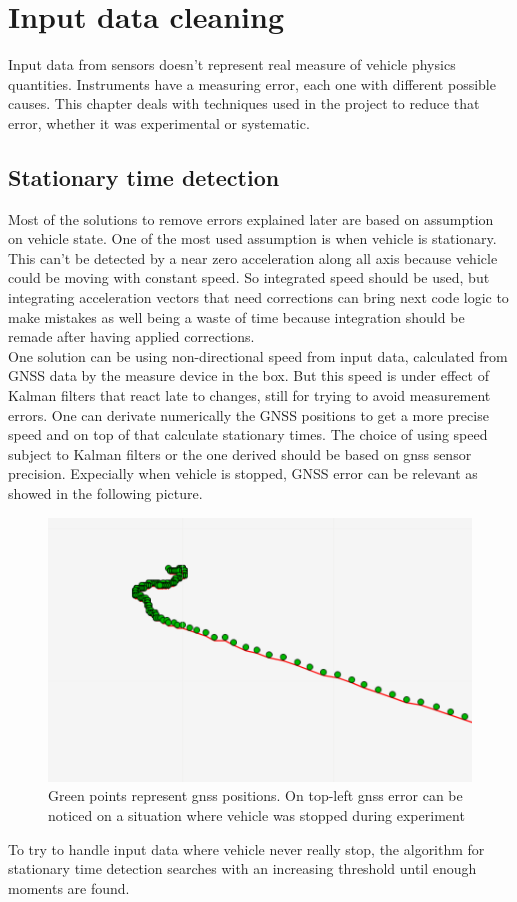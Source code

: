 \chapter{Input data cleaning}
\label{chap:input_data_cleaning}

Input data from sensors doesn't represent real measure of vehicle physics quantities. Instruments have a measuring error, each one with different possible causes. This chapter deals with techniques used in the project to reduce that error, whether it was experimental or systematic.

\section{Stationary time detection}
Most of the solutions to remove errors explained later are based on assumption on vehicle state. One of the most used assumption is when vehicle is stationary. \\
This can't be detected by a near zero acceleration along all axis because vehicle could be moving with constant speed. So integrated speed should be used, but integrating acceleration vectors that need corrections can bring next code logic to make mistakes as well being a waste of time because integration should be remade after having applied corrections. \\
One solution can be using non-directional speed from input data, calculated from GNSS data by the measure device in the box. But this speed is under effect of Kalman filters that react late to changes, still for trying to avoid measurement errors. One can derivate numerically the GNSS positions to get a more precise speed and on top of that calculate stationary times. The choice of using speed subject to Kalman filters or the one derived should be based on gnss sensor precision. Expecially when vehicle is stopped, GNSS error can be relevant as showed in the following picture.
\begin{figure}[H]
\includegraphics[width=\textwidth]{gnss_error_stationary_vehicle}
\caption{Green points represent gnss positions. On top-left gnss error can be noticed on a situation where vehicle was stopped during experiment}
\end{figure}
To try to handle input data where vehicle never really stop, the algorithm for stationary time detection searches with an increasing threshold until enough moments are found.

